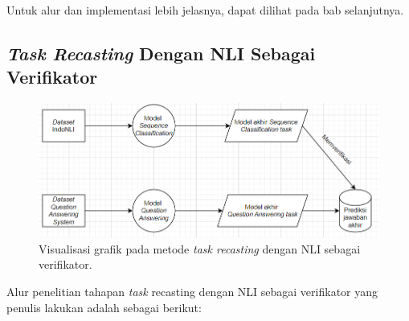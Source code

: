 Untuk alur dan implementasi lebih jelasnya, dapat dilihat pada bab selanjutnya.

\subsection{\emph{Task Recasting} Dengan NLI Sebagai Verifikator}
\label{3.4.2}

\begin{figure}[h]
\includegraphics[width=\linewidth]{assets/pics/alur2.png}
\centering
\caption{Visualisasi grafik pada metode \emph{task recasting} dengan NLI sebagai verifikator.}
\end{figure}

Alur penelitian tahapan \emph{task} recasting dengan NLI sebagai verifikator yang penulis lakukan adalah sebagai berikut:

